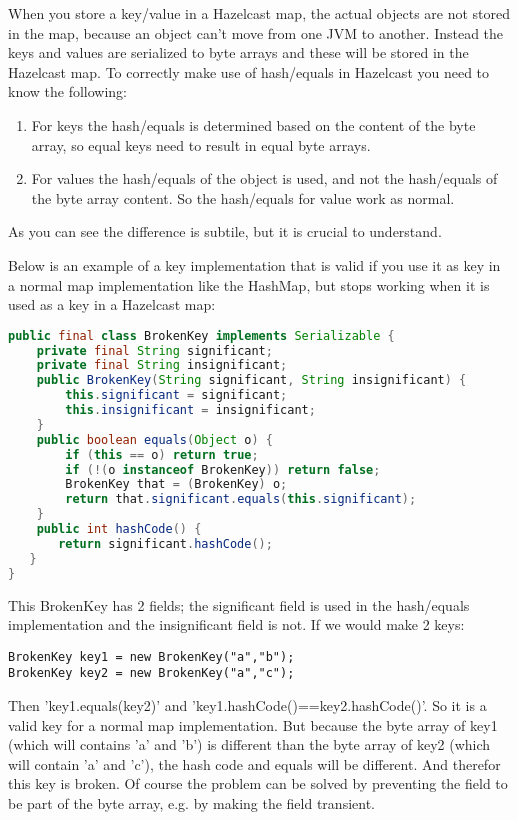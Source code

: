 When you store a key/value in a Hazelcast map, the actual objects are not stored in the map, because an object can't move from one JVM to another. Instead the keys and values are serialized to byte arrays and these will be stored in the Hazelcast map. To correctly make use of hash/equals in Hazelcast you need to know the following:
\begin{enumerate}
\item For keys the hash/equals is determined based on the content of the byte array, so equal keys need to result in equal byte arrays.
\item For values the hash/equals of the object is used, and not the hash/equals of the byte array content. So the hash/equals for value work as normal.
\end{enumerate}
As you can see the difference is subtile, but it is crucial to understand.

Below is an example of a key implementation that is valid if you use it as key in a normal map implementation like the HashMap, but stops working when it is used as a key in a Hazelcast map:
\begin{lstlisting}[language=java]
public final class BrokenKey implements Serializable {
    private final String significant;
    private final String insignificant;
    public BrokenKey(String significant, String insignificant) {
        this.significant = significant;
        this.insignificant = insignificant;
    }
    public boolean equals(Object o) {
        if (this == o) return true;
        if (!(o instanceof BrokenKey)) return false;
        BrokenKey that = (BrokenKey) o;
        return that.significant.equals(this.significant);
    }
    public int hashCode() {
       return significant.hashCode();
   }
}
\end{lstlisting}
This BrokenKey has 2 fields; the significant field is used in the hash/equals implementation and the insignificant field is not. If we would make 2 keys:
\begin{lstlisting}
BrokenKey key1 = new BrokenKey("a","b");
BrokenKey key2 = new BrokenKey("a","c");
\end{lstlisting} 
Then 'key1.equals(key2)' and 'key1.hashCode()==key2.hashCode()'. So it is a valid key for a normal map implementation. But because the byte array of key1 (which will contains 'a' and 'b') is different than the byte array of key2 (which will contain 'a' and 'c'), the hash code and equals will be different. And therefor this key is broken. Of course the problem can be solved by preventing the field to be part of the byte array, e.g. by making the field transient.


